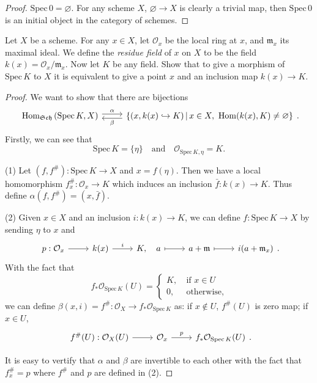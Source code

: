 \begin{proof}
	$\mathrm{Spec}\,0 = \varnothing$. For any scheme $X$, $\varnothing \to X$ is clearly a trivial map, then $\mathrm{Spec}\,0$ is an initial object in the category of schemes.
\end{proof}
\begin{exe}
	\label{2.2.7}
	Let $X$ be a scheme. For any $x\in X$, let $\mathcal{O}_x$ be the local ring at $x$, and $\mathfrak{m}_x$ its maximal ideal. We define the \emph{residue field} of $x$ on $X$ to be the field $k(x)=\mathcal{O}_x/\mathfrak{m}_x$. Now let $K$ be any field. Show that to give a morphism of $\mathrm{Spec}\,K$ to $X$ it is equivalent to give a point $x$ and an inclusion map $k(x)\to K$.
\end{exe}
\begin{proof}
	We want to show that there are bijections
	\begin{equation*}
		\begin{tikzcd}
			{\mathrm{Hom}_{\mathfrak{Sch}}\left(\mathrm{Spec}\,K,X\right)} \arrow[r, "\alpha", shift left] & {\{(x,k(x)\hookrightarrow K)\,|\,x\in X,\ \mathrm{Hom}(k(x),K)\neq\varnothing\}} \arrow[l, "\beta", shift left]
		\end{tikzcd}.
	\end{equation*}
	Firstly, we can see that$$\mathrm{Spec}\,K=\{\eta\}\quad\text{and}\quad\mathcal{O}_{\mathrm{Spec}\,K,\eta}=K.$$
	
	(1) Let $(f,f^\#):\mathrm{Spec}\,K\to X$ and $x=f(\eta)$. Then we have a local homomorphism $f_x^\#:\mathcal{O}_x\to K$ which induces an inclusion $\bar{f}:k(x)\to K$. Thus define $\alpha(f,f^\#)=(x,\bar{f})$.
	
	(2) Given $x\in X$ and an inclusion $i:k(x)\to K$, we can define $f:\mathrm{Spec}\,K\to X$ by sending $\eta$ to $x$ and
	\begin{equation*}
		\begin{tikzcd}
			p:\mathcal{O}_x \arrow[r] & k(x) \arrow[r, "i"] & {K,\quad a} \arrow[r, maps to] & a+\mathfrak{m} \arrow[r, maps to] & i(a+\mathfrak{m}_x)
		\end{tikzcd}.
	\end{equation*}
	With the fact that
	\begin{equation*}
		f_*\mathcal{O}_{\mathrm{Spec}\,K}(U)=\left\{\begin{matrix}
			K,\ &\text{if }x\in U\\
			0,\ &\text{otherwise},
		\end{matrix}
		\right.
	\end{equation*}
	we can define $\beta(x,i)=f^\#:\mathcal{O}_X\to f_*\mathcal{O}_{\mathrm{Spec}\,K}$ as: if $x\notin U$, $f^\#(U)$ is zero map; if $x\in U$,
	\begin{equation*}
		\begin{tikzcd}
			f^\#(U):\mathcal{O}_X(U) \arrow[r] & \mathcal{O}_x \arrow[r, "p"] & {f_*\mathcal{O}_{\mathrm{Spec}\,K}(U)}
		\end{tikzcd}.
	\end{equation*}
	
	It is easy to vertify that $\alpha$ and $\beta$ are invertible to each other with the fact that $f^\#_x=p$ where $f^\#$ and $p$ are defined in (2).
\end{proof}

